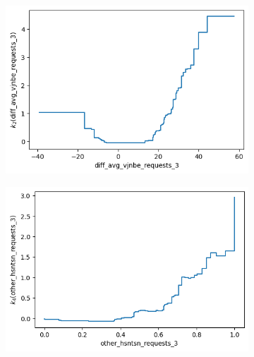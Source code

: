 \documentclass[12pt,titlepage]{article}
\begin{document}
\begin{figure}[H]
\begin{subfigure}{.55\textwidth}
        \end{subfigure} \\
        \begin{subfigure}{.55\textwidth}
            \centering
            \includegraphics[width=1\linewidth]{shape_function_diff_avg_vjnbe_requests_3.png}
        \end{subfigure}%
        \begin{subfigure}{.55\textwidth}
            \centering
            \includegraphics[width=1\linewidth]{shape_function_other_hsntsn_requests_3.png}
        \end{subfigure} \\
        \begin{subfigure}{.55\textwidth}
            \centering

\end{subfigure}
\end{figure}
\end{document}
